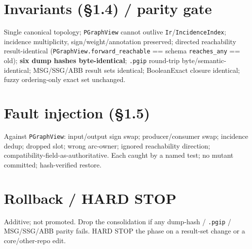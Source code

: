 \documentclass[11pt]{article}\usepackage[margin=1in]{geometry}\usepackage{hyperref}\usepackage{longtable}
\begin{document}
\section*{Invariants (\S1.4) / parity gate}
Single canonical topology; \texttt{PGraphView} cannot outlive \texttt{Ir}/\texttt{IncidenceIndex}; incidence
multiplicity, sign/weight/annotation preserved; directed reachability result-identical
(\texttt{PGraphView.forward\_reachable} == schema \texttt{reaches\_any} == old); \textbf{six dump hashes
byte-identical}; \texttt{.pgip} round-trip byte/semantic-identical; MSG/SSG/ABB result sets identical;
BooleanExact closure identical; fuzzy ordering-only exact set unchanged.
\section*{Fault injection (\S1.5)}
Against \texttt{PGraphView}: input/output sign swap; producer/consumer swap; incidence dedup; dropped slot;
wrong arc-owner; ignored reachability direction; compatibility-field-as-authoritative. Each caught by a
named test; no mutant committed; hash-verified restore.
\section*{Rollback / HARD STOP}
Additive; not promoted. Drop the consolidation if any dump-hash / \texttt{.pgip} / MSG/SSG/ABB parity fails.
HARD STOP the phase on a result-set change or a core/other-repo edit.
\end{document}
